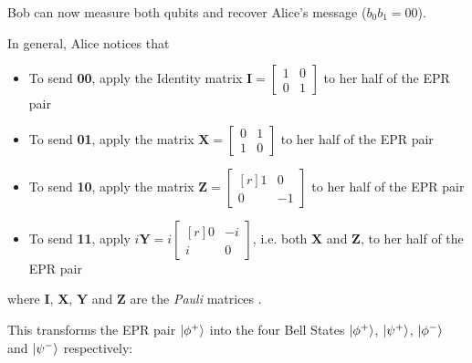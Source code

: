\documentclass{article}
\theoremstyle{definition}
\begin{document}
\bigskip
\noindent
Bob can now measure both qubits and recover Alice's message
($b_0b_1 = 00$).  


\bigskip
\noindent
In general, Alice notices that 

\begin{itemize}
\item To send \textbf{00}, apply the Identity matrix $\mathbf{I}
= \begin{bmatrix} 1 & 0 \\ 0 & 1 \end{bmatrix}$ to her half of
the EPR pair 
\item To send \textbf{01}, apply the matrix $\mathbf{X}
= \begin{bmatrix} 0 & 1 \\ 1 & 0 \end{bmatrix}$ to her half of
the EPR pair 
\item To send \textbf{10}, apply the matrix $\mathbf{Z}
= \begin{bmatrix}[r] 1 & 0 \\ 0 & -1 \end{bmatrix}$ to her half
of the EPR pair 
\item To send \textbf{11}, apply $i\mathbf{Y} =
i \begin{bmatrix}[r] 0 & -i \\ i & 0 \end{bmatrix}$, i.e. both
$\mathbf{X}$ and $\mathbf{Z}$,  to her half of the EPR pair 
\end{itemize} 

\bigskip
\noindent
where $\mathbf{I}$, $\mathbf{X}$, $\mathbf{Y}$ and $\mathbf{Z}$
are the \emph{Pauli} matrices \cite{wiki:pauli_matrices}.

\bigskip
\noindent
This transforms the EPR pair $\ket{\phi^+}$ into the four Bell
States $\ket{\phi^+}$, $\ket{\psi^+}$, $\ket{\phi^-}$ and
$\ket{\psi^-}$ respectively: 
\end{document}
